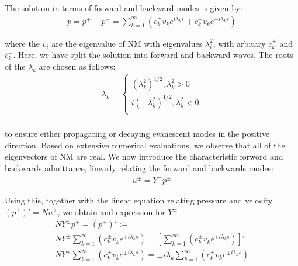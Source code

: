 \documentclass{Note}
\begin{document}
The solution in terms of forward and backward modes is given by:
\begin{equation}
\begin{aligned}
p=p^{+}+p^{-}=\sum_{k=1}^\infty(c_k^{+}v_k e^{i\lambda_ks}+c_k^{-}v_k e^{-i\lambda_ks})
\end{aligned}
\end{equation}

where the $v_i$ are the eigenvalue of NM with eigenvalues $\lambda_i^2$, with arbitary $c_k^{+}$ and  $c_k^{-}$.  Here, we have split the solution into forward and backward waves. The roots of the $\lambda_k$ are chosen as follows:
\begin{equation}
\begin{aligned}
\lambda_k=\left\{\begin{matrix}
(\lambda_k^2)^{1/2}, \lambda_k^2>0\\
i(-\lambda_k^2)^{1/2}, \lambda_k^2<0\\
\end{matrix}\right.\\
\end{aligned}
\end{equation}

to ensure either propagating or decaying evanescent modes in the positive direction. Based on extensive numerical evaluations, we observe that all of the eigenvectors of NM are real. We now introduce the characteristic forword and backwards admittance, linearly relating the forward and backwards modes:
\begin{equation}
\begin{aligned}
u^{\pm}=Y^{\pm}p^{\pm}
\end{aligned}
\end{equation}

Using this, together with the linear equation relating pressure and velocity  $(p^{\pm})'=Nu^{\pm}$, we obtain and expression for $Y^{\pm}$
\begin{equation}
\begin{aligned}
NY^{\pm}p^{\pm}=(p^{\pm})':=\\
NY^{\pm} \sum_{k=1}^\infty(c_k^{\pm}v_k e^{\pm i\lambda_ks})=[\sum_{k=1}^\infty(c_k^{\pm}v_k e^{\pm i\lambda_ks})]'\\
NY^{\pm} \sum_{k=1}^\infty(c_k^{\pm}v_k e^{\pm i\lambda_ks})=\pm i\lambda_k \sum_{k=1}^\infty(c_k^{\pm}v_k e^{\pm i\lambda_ks})\\
\end{aligned}
\end{equation}
\end{document}
